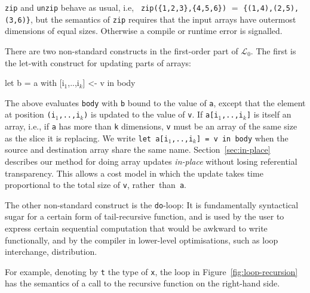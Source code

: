 \documentclass{sigplanconf}  %
\newcommand{\mymath}[1]{$ #1 $}
\newcommand{\myindx}[1]{_{#1}}
\newcommand{\LO}{$\mathcal{L}_0$}
\begin{document}
{\tt zip} and {\tt unzip} behave as usual, i.e, {\tt
  zip(\{1,2,3\},\{4,5,6\})} $=$ {\tt \{{(1,4),(2,5),(3,6)}\}}, but the
semantics of {\tt zip} requires that the input arrays have outermost
dimensions of equal sizes. Otherwise a compile or runtime error is signalled.

There are two non-standard constructs in the first-order part  %
of \LO{}.  The first is the let-with construct for updating parts of
arrays:

\begin{colorcode}
let b = a with [i\mymath{\myindx{1}},..,i\mymath{\myindx{k}}] <- v in body
\end{colorcode}

The above evaluates {\tt body} with {\tt b} bound to the value of {\tt a}, 
except that the element at position {\tt (i$_1$,..,i$_k$)} is updated to
the value of {\tt v}.  If {\tt a[i$_1$,..,i$_k$]} is itself an array,
i.e., if {\tt a} has more than {\tt k} dimensions, {\tt v} must be 
an array of the same size as the slice it is replacing.  We write 
{\tt let~a[i$_1$,..,i$_k$]~=~v~in~body} when the 
source and destination array share the same name.
%
Section~\ref{sec:in-place} describes our method for doing array updates 
{\em in-place} without losing referential transparency. This allows a 
cost model in which the update takes time proportional to the total 
size of {\tt v}, rather~than~{\tt a}.

The other non-standard construct is the {\tt do}-loop:  
It is fundamentally syntactical sugar for a certain form of 
tail-recursive function, and is used by the user to express
certain sequential computation that would be awkward to write
functionally, and by the compiler in lower-level optimisations,
such as loop interchange, distribution.  


For example, denoting by {\tt t} the type of {\tt x}, the loop in
Figure~\ref{fig:loop-recursion} has the semantics of a call to the
recursive function on the right-hand side.
\end{document}
